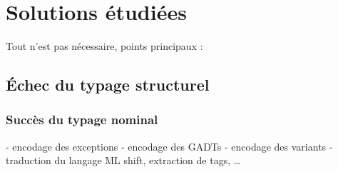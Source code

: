 \chapter{Solutions étudiées}

Tout n'est pas nécessaire, points principaux :

\section{Échec du typage structurel}

\subsection{Succès du typage nominal}

- encodage des exceptions
- encodage des GADTs
- encodage des variants
  - traduction du langage ML
    shift, extraction de tags, …
